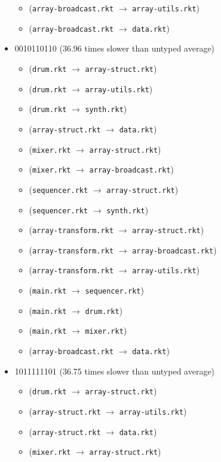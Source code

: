 \documentclass{article}
\newcommand{\mono}[1]{\texttt{#1}}
\begin{document}
\begin{itemize}
\begin{itemize}
  \item (\mono{array-broadcast.rkt} $\rightarrow$ \mono{array-utils.rkt})
  \item (\mono{array-broadcast.rkt} $\rightarrow$ \mono{data.rkt})
  \end{itemize}
\item 0010110110 (36.96 times slower than untyped average)
  \begin{itemize}
  \item (\mono{drum.rkt} $\rightarrow$ \mono{array-struct.rkt})
  \item (\mono{drum.rkt} $\rightarrow$ \mono{array-utils.rkt})
  \item (\mono{drum.rkt} $\rightarrow$ \mono{synth.rkt})
  \item (\mono{array-struct.rkt} $\rightarrow$ \mono{data.rkt})
  \item (\mono{mixer.rkt} $\rightarrow$ \mono{array-struct.rkt})
  \item (\mono{mixer.rkt} $\rightarrow$ \mono{array-broadcast.rkt})
  \item (\mono{sequencer.rkt} $\rightarrow$ \mono{array-struct.rkt})
  \item (\mono{sequencer.rkt} $\rightarrow$ \mono{synth.rkt})
  \item (\mono{array-transform.rkt} $\rightarrow$ \mono{array-struct.rkt})
  \item (\mono{array-transform.rkt} $\rightarrow$ \mono{array-broadcast.rkt})
  \item (\mono{array-transform.rkt} $\rightarrow$ \mono{array-utils.rkt})
  \item (\mono{main.rkt} $\rightarrow$ \mono{sequencer.rkt})
  \item (\mono{main.rkt} $\rightarrow$ \mono{drum.rkt})
  \item (\mono{main.rkt} $\rightarrow$ \mono{mixer.rkt})
  \item (\mono{array-broadcast.rkt} $\rightarrow$ \mono{data.rkt})
  \end{itemize}
\item 1011111101 (36.75 times slower than untyped average)
  \begin{itemize}
  \item (\mono{drum.rkt} $\rightarrow$ \mono{array-struct.rkt})
  \item (\mono{array-struct.rkt} $\rightarrow$ \mono{array-utils.rkt})
  \item (\mono{array-struct.rkt} $\rightarrow$ \mono{data.rkt})
  \item (\mono{mixer.rkt} $\rightarrow$ \mono{array-struct.rkt})

\end{itemize}
\end{itemize}
\end{document}
